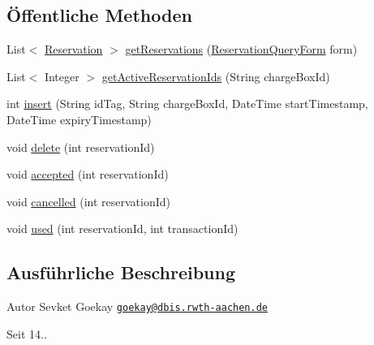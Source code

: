 \subsection*{Öffentliche Methoden}
\begin{DoxyCompactItemize}
\item 
List$<$ \hyperlink{classde_1_1rwth_1_1idsg_1_1steve_1_1repository_1_1dto_1_1_reservation}{Reservation} $>$ \hyperlink{classde_1_1rwth_1_1idsg_1_1steve_1_1repository_1_1impl_1_1_reservation_repository_impl_a4a72a06f1abbea995dd5ca23efd2ee43}{get\-Reservations} (\hyperlink{classde_1_1rwth_1_1idsg_1_1steve_1_1web_1_1dto_1_1_reservation_query_form}{Reservation\-Query\-Form} form)
\item 
List$<$ Integer $>$ \hyperlink{classde_1_1rwth_1_1idsg_1_1steve_1_1repository_1_1impl_1_1_reservation_repository_impl_ab259376eb118b54a91286a76adfc0633}{get\-Active\-Reservation\-Ids} (String charge\-Box\-Id)
\item 
int \hyperlink{classde_1_1rwth_1_1idsg_1_1steve_1_1repository_1_1impl_1_1_reservation_repository_impl_a77174d7ace6a347d28950a1eb606ca19}{insert} (String id\-Tag, String charge\-Box\-Id, Date\-Time start\-Timestamp, Date\-Time expiry\-Timestamp)
\item 
void \hyperlink{classde_1_1rwth_1_1idsg_1_1steve_1_1repository_1_1impl_1_1_reservation_repository_impl_acc4a8d029888cc40c9835a08fc46ff75}{delete} (int reservation\-Id)
\item 
void \hyperlink{classde_1_1rwth_1_1idsg_1_1steve_1_1repository_1_1impl_1_1_reservation_repository_impl_ac31eb4a7f67b91159937e5fcfbf7e1cc}{accepted} (int reservation\-Id)
\item 
void \hyperlink{classde_1_1rwth_1_1idsg_1_1steve_1_1repository_1_1impl_1_1_reservation_repository_impl_a20b354811652a05d1134f8ccfe9f84ec}{cancelled} (int reservation\-Id)
\item 
void \hyperlink{classde_1_1rwth_1_1idsg_1_1steve_1_1repository_1_1impl_1_1_reservation_repository_impl_ad41ba5d5991f1c8563831c08b8e99b8f}{used} (int reservation\-Id, int transaction\-Id)
\end{DoxyCompactItemize}


\subsection{Ausführliche Beschreibung}
\begin{DoxyAuthor}{Autor}
Sevket Goekay \href{mailto:goekay@dbis.rwth-aachen.de}{\tt goekay@dbis.\-rwth-\/aachen.\-de} 
\end{DoxyAuthor}
\begin{DoxySince}{Seit}
14.. 
\end{DoxySince}


